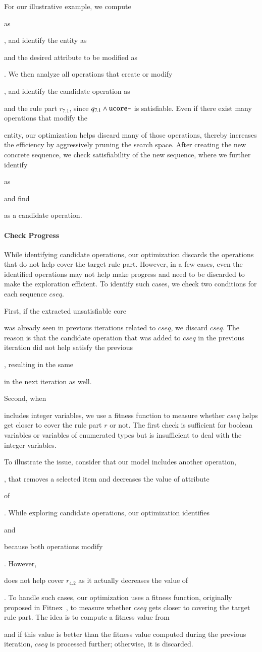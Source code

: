 For our illustrative example, we compute \subject{ucore-} as
\subject{ord.total > 0}, and identify the entity as \subject{Order} and the
desired attribute to be modified as \subject{total}. We then analyze all operations
that create or modify \subject{Order}, and identify the candidate operation
as \subject{AddItemToOrder} and the rule part $r_{7.1}$, since $q_{7.1} \wedge
\subject{ucore-}$ is satisfiable. Even if there exist
many operations that modify the \subject{Order} entity, our optimization
helps discard many of those operations, thereby increases the efficiency
by aggressively pruning the search space. 
After creating the new concrete sequence, we check satisfiability of the new
sequence, where we further identify \subject{ucore} as
\subject{cust.crLimit = 0 $\wedge$ cust.crLimit > 0} and find \subject{AddCreditLimit}
as a candidate operation.

\paragraph*{Check Progress} While identifying candidate operations, our
optimization discards the operations that do not help cover the target rule
part. However, in a few cases, even the identified operations may not help make
progress and need to be discarded to make the exploration efficient. To identify
such cases, we check two conditions for each sequence $cseq$.

First, if the extracted unsatisfiable core \subject{ucore} was already seen in
previous iterations related to $cseq$, we discard $cseq$. The reason
is that the candidate operation that was added to $cseq$ in the previous
iteration did not help satisfy the previous \subject{ucore}, resulting in the
same \subject{ucore} in the next iteration as well.

Second, when \subject{ucore} includes integer variables, we use a
fitness function to measure whether $cseq$ helps get closer to cover the rule
part $r$ or not. The first check is sufficient for boolean variables or
variables of enumerated types but is insufficient to deal with the integer
variables.

To illustrate the issue, consider that our model includes another operation,
\subject{RemoveItemFromOrder}, that removes a selected item and decreases the
value of attribute \subject{total} of \subject{Order}. While exploring candidate
operations, our optimization identifies \subject{AddItemToOrder} and
\subject{RemoveItemFromOrder} because both operations modify
\subject{total}. However, \subject{RemoveItemFromOrder} does not help cover
$r_{4.2}$ as it actually decreases the value of \subject{total}. To handle such
cases, our optimization uses a fitness function, originally proposed in
Fitnex~\cite{xie09:fitness}, to measure whether $cseq$ gets closer to covering
the target rule part. The idea is to compute a fitness value from
\subject{ucore} and if this value is better than the fitness value computed
during the previous iteration, $cseq$ is processed further; otherwise, it is
discarded.
